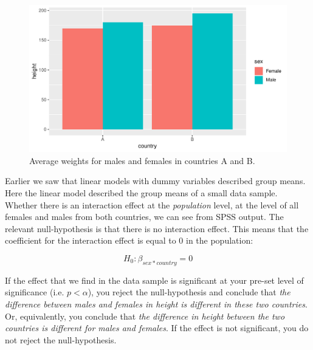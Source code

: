 \documentclass[]{report}\usepackage[]{graphicx}\usepackage[]{color}
\makeatletter
\def\maxwidth{ %
  \ifdim\Gin@nat@width>\linewidth
    \linewidth
  \else
    \Gin@nat@width
  \fi
}
\newenvironment{knitrout}{}{} %
\makeatother
\begin{document}
\begin{knitrout}
\color{fgcolor}\begin{figure}

{\centering \includegraphics[width=\maxwidth]{figure/country_sex2-1} 

}

\caption[Average weights for males and females in countries A and B]{Average weights for males and females in countries A and B.}\label{fig:country_sex2}
\end{figure}


\end{knitrout}


Earlier we saw that linear models with dummy variables described group means. Here the linear model described the group means of a small data sample. Whether there is an interaction effect at the \textit{population} level, at the level of all females and males from both countries, we can see from SPSS output. The relevant null-hypothesis is that there is no interaction effect. This means that the coefficient for the interaction effect is equal to 0 in the population:

\begin{equation}
H_0: \beta_{sex*country}=0
\end{equation}

If the effect that we find in the data sample is significant at your pre-set level of significance (i.e. $p < \alpha$), you reject the null-hypothesis and conclude that \textit{the difference between males and females in height is different in these two countries}. Or, equivalently, you conclude that \textit{the difference in height between the two countries is different for males and females}. If the effect is not significant, you do not reject the null-hypothesis.
\end{document}
